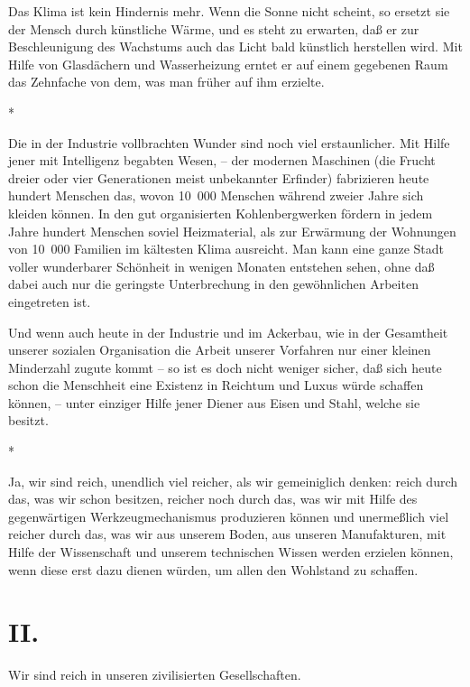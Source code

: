 \documentclass{scrbook}
\begin{document}
Das Klima ist kein Hindernis mehr. Wenn die Sonne nicht scheint, so ersetzt sie der Mensch durch künstliche Wärme, und es steht zu erwarten, daß er zur Beschleunigung des Wachstums auch das Licht bald künstlich herstellen wird. Mit Hilfe von Glasdächern und Wasserheizung erntet er auf einem gegebenen Raum das Zehnfache von dem, was man früher auf ihm erzielte.

\begin{center}*\end{center}

Die in der Industrie vollbrachten Wunder sind noch viel erstaunlicher. Mit Hilfe jener mit Intelligenz begabten Wesen, – der modernen Maschinen (die Frucht dreier oder vier Generationen meist unbekannter Erfinder) fabrizieren heute hundert Menschen das, wovon 10~000 Menschen während zweier Jahre sich kleiden können. In den gut organisierten Kohlenbergwerken fördern in jedem Jahre hundert Menschen soviel Heizmaterial, als zur Erwärmung der Wohnungen von 10~000 Familien im kältesten Klima ausreicht. Man kann eine ganze Stadt voller wunderbarer Schönheit in wenigen Monaten entstehen sehen, ohne daß dabei auch nur die geringste Unterbrechung in den gewöhnlichen Arbeiten eingetreten ist.

Und wenn auch heute in der Industrie und im Ackerbau, wie in der Gesamtheit unserer sozialen Organisation die Arbeit unserer Vorfahren nur einer kleinen Minderzahl zugute kommt – so ist es doch nicht weniger sicher, daß sich heute schon die Menschheit eine Existenz in Reichtum und Luxus würde schaffen können, – unter einziger Hilfe jener Diener aus Eisen und Stahl, welche sie besitzt.

\begin{center}*\end{center}

Ja, wir sind reich, unendlich viel reicher, als wir gemeiniglich denken: reich durch das, was wir schon besitzen, reicher noch durch das, was wir mit Hilfe des gegenwärtigen Werkzeugmechanismus produzieren können und unermeßlich viel reicher durch das, was wir aus unserem Boden, aus unseren Manufakturen, mit Hilfe der Wissenschaft und unserem technischen Wissen werden erzielen können, wenn diese erst dazu dienen würden, um allen den Wohlstand zu schaffen.

\section*{II.}
Wir sind reich in unseren zivilisierten Gesellschaften.
\end{document}

